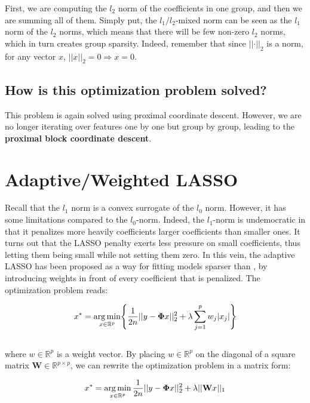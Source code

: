 \documentclass[a4paper,10pt]{article}
\theoremstyle{definition}
\begin{document}
First, we are computing the $l_2$ norm of the coefficients in one group, and then we are summing all of them. Simply put, the $l_1/l_2$-mixed norm can be seen
as the $l_1$ norm of the $l_2$ norms, which means that there will be few non-zero $l_2$ norms, which in turn creates group sparsity. Indeed, remember that since $\lvert \lvert \cdot \rvert \rvert_2$ is a norm, for any vector $x$,
$\lvert\lvert x \rvert\rvert_2 = 0 \Rightarrow x = 0$.

\subsection*{How is this optimization problem solved?}

This problem is again solved using proximal coordinate descent. However, we are no longer iterating over features one by one but group by group, leading to the \textbf{proximal block coordinate descent}.

\section{Adaptive/Weighted LASSO}
\label{section_3}

Recall that the $l_1$ norm is a convex surrogate of the $l_0$ norm. However, it has some limitations compared to
the $l_0$-norm. Indeed, the $l_1$-norm is undemocratic in that it penalizes more heavily coefficients larger coefficients than smaller ones. It turns out that the LASSO penalty exerts less pressure on small coefficients,
thus letting them being small while not setting them zero. In this vein, the adaptive LASSO has been proposed as a way for fitting models sparser than , by introducing weights in front of every coefficient that is
penalized. The optimization problem reads:

\begin{equation*}
    x^* = \operatorname*{arg\,min}_{x \in \mathbb{R}^p} \Biggl\{ \frac{1}{2n} \lvert\lvert y - \mathbf{\Phi}x \rvert\rvert_2^2 + \lambda \sum_{j=1}^p w_j \lvert x_j \rvert \Biggr\}
\end{equation*}
\\
where $w \in \mathbb{R}^p$ is a weight vector. By placing $w \in \mathbb{R}^p$ on the diagonal of a square matrix $\mathbf{W} \in \mathbb{R}^{p \times p}$, we can rewrite the optimization problem in a matrix form:

\begin{equation*}
    x^* = \operatorname*{arg\,min}_{x \in \mathbb{R}^p} \frac{1}{2n} \lvert\lvert y - \mathbf{\Phi}x \rvert\rvert_2^2 + \lambda \lvert\vert \mathbf{W}x \rvert\rvert_1
\end{equation*}
\end{document}
